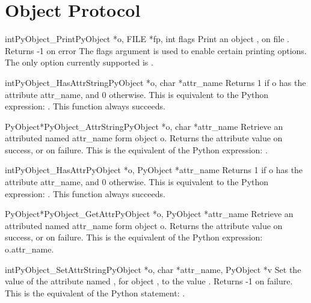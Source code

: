 \section{Object Protocol}

     \begin{cfuncdesc}{int}{PyObject_Print}{PyObject *o, FILE *fp, int flags}
         Print an object , on file .  Returns -1 on error
	 The flags argument is used to enable certain printing
	 options. The only option currently supported is . 
     \end{cfuncdesc}

     \begin{cfuncdesc}{int}{PyObject_HasAttrString}{PyObject *o, char *attr_name}
         Returns 1 if o has the attribute attr_name, and 0 otherwise.
	 This is equivalent to the Python expression:
	 .
	 This function always succeeds.
     \end{cfuncdesc}

     \begin{cfuncdesc}{PyObject*}{PyObject_AttrString}{PyObject *o, char *attr_name}
	 Retrieve an attributed named attr_name form object o.
	 Returns the attribute value on success, or {\NULL} on failure.
	 This is the equivalent of the Python expression: .
     \end{cfuncdesc}


     \begin{cfuncdesc}{int}{PyObject_HasAttr}{PyObject *o, PyObject *attr_name}
         Returns 1 if o has the attribute attr_name, and 0 otherwise.
	 This is equivalent to the Python expression:
	 . 
	 This function always succeeds.
     \end{cfuncdesc}


     \begin{cfuncdesc}{PyObject*}{PyObject_GetAttr}{PyObject *o, PyObject *attr_name}
	 Retrieve an attributed named attr_name form object o.
	 Returns the attribute value on success, or {\NULL} on failure.
	 This is the equivalent of the Python expression: o.attr_name.
     \end{cfuncdesc}


     \begin{cfuncdesc}{int}{PyObject_SetAttrString}{PyObject *o, char *attr_name, PyObject *v}
	 Set the value of the attribute named , for object ,
	 to the value . Returns -1 on failure.  This is
	 the equivalent of the Python statement: .
     \end{cfuncdesc}


